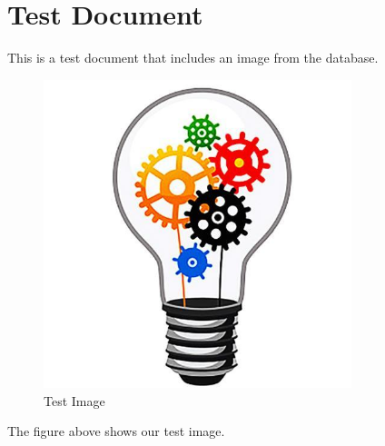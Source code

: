 \documentclass{article}
\begin{document}
\section{Test Document}

This is a test document that includes an image from the database.

\begin{figure}[htbp]
    \centering
    \includegraphics[width=0.8\textwidth]{CreateBulb.jpg}
    \caption{Test Image}
    \label{fig:test-image}
\end{figure}

The figure above shows our test image.
\end{document}
